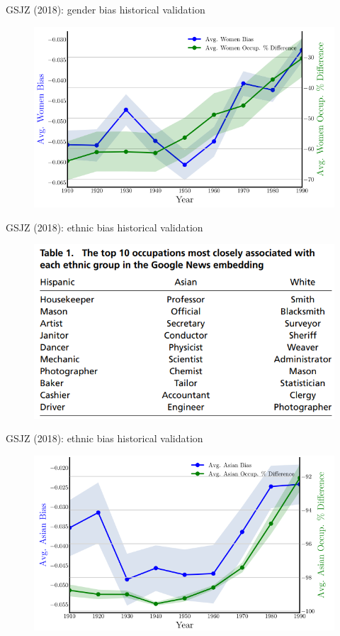 \documentclass[usenames,dvipsnames,english]{beamer}
\begin{document}
\begin{frame}{GSJZ (2018): gender bias historical validation}
\begin{figure}
    \centering
    \includegraphics[scale = 0.6]{Images/gsjz_validation2.png}
\end{figure}
\end{frame}
\begin{frame}{GSJZ (2018): ethnic bias historical validation}
\begin{figure}
    \centering
    \includegraphics[scale = 0.5]{Images/gsjz_validation3.png}
\end{figure}
\end{frame}
\begin{frame}{GSJZ (2018): ethnic bias historical validation}
\begin{figure}
    \centering
    \includegraphics[scale = 0.6]{Images/gsjz_validation4.png}
\end{figure}
\end{frame}
\end{document}
